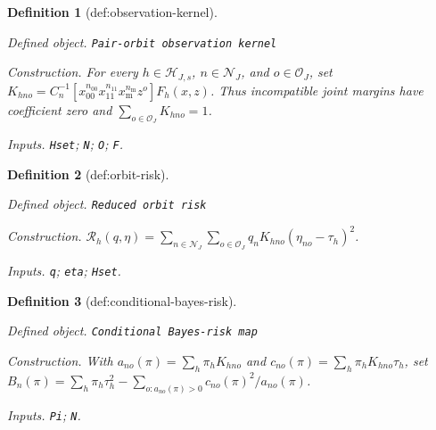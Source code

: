 \documentclass{article}
\newtheorem{definition}{Definition}
\begin{document}
\begin{definition}[def:observation-kernel]\label{def:observation-kernel}
\par\smallskip\noindent\emph{Defined object.} \texttt{Pair-\allowbreak{}orbit observation kernel}
\par\smallskip\noindent\emph{Construction.} For every \(h\in\mathcal H_{J,s}\), \(n\in\mathcal N_J\), and \(o\in\mathcal O_J\), set \(K_{hno}=C_n^{-1}[x_{00}^{n_{00}}x_{11}^{n_{11}}x_{\mathrm m}^{n_{\mathrm m}}z^o]F_h(x,z)\). Thus incompatible joint margins have coefficient zero and \(\sum_{o\in\mathcal O_J}K_{hno}=1\).
\par\smallskip\noindent\emph{Inputs.} \texttt{Hset}; \texttt{N}; \texttt{O}; \texttt{F}.
\end{definition}

\begin{definition}[def:orbit-risk]\label{def:orbit-risk}
\par\smallskip\noindent\emph{Defined object.} \texttt{Reduced orbit risk}
\par\smallskip\noindent\emph{Construction.} \(\mathcal R_h(q,\eta)=\sum_{n\in\mathcal N_J}\sum_{o\in\mathcal O_J}q_nK_{hno}(\eta_{no}-\tau_h)^2\).
\par\smallskip\noindent\emph{Inputs.} \texttt{q}; \texttt{eta}; \texttt{Hset}.
\end{definition}

\begin{definition}[def:conditional-bayes-risk]\label{def:conditional-bayes-risk}
\par\smallskip\noindent\emph{Defined object.} \texttt{Conditional Bayes-\allowbreak{}risk map}
\par\smallskip\noindent\emph{Construction.} With \(a_{no}(\pi)=\sum_h\pi_hK_{hno}\) and \(c_{no}(\pi)=\sum_h\pi_hK_{hno}\tau_h\), set \(B_n(\pi)=\sum_h\pi_h\tau_h^2-\sum_{o:a_{no}(\pi)>0}c_{no}(\pi)^2/a_{no}(\pi)\).
\par\smallskip\noindent\emph{Inputs.} \texttt{Pi}; \texttt{N}.
\end{definition}
\end{document}
